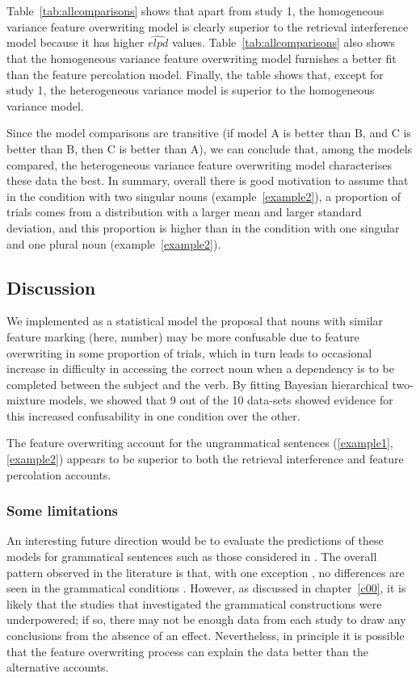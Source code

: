 \documentclass{cambridge7A}\usepackage[]{graphicx}\usepackage[]{color}
\begin{document}
Table~\ref{tab:allcomparisons}  shows that 
apart from study 1, the homogeneous variance feature overwriting model is clearly superior to the retrieval interference model because it has higher $\widehat{elpd}$ values. 
Table~\ref{tab:allcomparisons} also shows that the homogeneous variance feature overwriting model furnishes a better fit than the feature percolation model. Finally, the table shows that, except for study 1, the heterogeneous variance model is superior to the homogeneous variance model.

Since the model comparisons are transitive (if model A is better than B, and C is better than B, then C is better than A), we can conclude that, among the models compared, the heterogeneous variance feature overwriting model characterises these data the best. 
In summary, overall there is good motivation to assume that in the
condition with two singular nouns (example~\ref{example2}), a proportion of trials comes from a distribution with a larger mean and larger standard deviation, and this proportion is higher than in the condition with one singular and one plural noun (example~\ref{example2}). 

\subsection{Discussion}

We implemented as a statistical model the proposal that nouns with similar feature marking (here, number) may be more confusable due to feature overwriting in some proportion of trials, which in turn leads to occasional increase in difficulty in accessing the correct noun when a dependency is to be completed between the subject and the verb. By fitting Bayesian hierarchical two-mixture models, we showed that 9 out of the 10 data-sets showed evidence for this increased confusability in one condition over the other. 

The feature overwriting account for the ungrammatical sentences (\ref{example1}, \ref{example2}) appears to be superior to both the retrieval interference and feature percolation accounts. 

\subsubsection{Some limitations}

An interesting future direction would be to evaluate the predictions of these models for grammatical sentences such as those considered in \cite{VillataFranck}. The overall pattern observed in the literature is that, with one exception \citep{nicenboimexploratory}, no differences are seen in the grammatical conditions \citep[see, e.g., the meta-analysis results reported in][]{JaegerEngelmannVasishth2017}. However, as discussed in chapter~\ref{c00}, it is likely that the studies that investigated the grammatical constructions were underpowered; if so, there may not be enough data from each study to draw any conclusions from the absence of an effect. Nevertheless, in principle it is possible that the feature overwriting process can explain the data better than the alternative accounts. 
\end{document}
